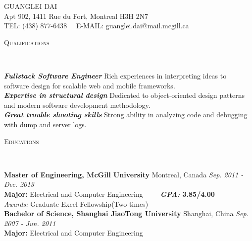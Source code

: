 \documentclass[11pt]{article}
\newenvironment{changemargin}[2]{%
  \begin{list}{}{%
    \setlength{\topsep}{0pt}%
    \setlength{\leftmargin}{#1}%
    \setlength{\rightmargin}{#2}%
    \setlength{\listparindent}{\parindent}%
    \setlength{\itemindent}{\parindent}%
    \setlength{\parsep}{\parskip}%
  }%
  \item[]}{\end{list}
}
\newcommand{\lineover}{
	\begin{changemargin}{-0.05in}{-0.05in}
		\vspace*{-8pt}
		\hrulefill \\
		\vspace*{-2pt}
	\end{changemargin}
}
\newcommand{\header}[1]{
	\begin{changemargin}{-0.5in}{-0.5in}
		\scshape{#1}\\
  	\lineover
	\end{changemargin}
}
\newcommand{\contact}[4]{
	\begin{changemargin}{-0.5in}{-0.5in}
		\begin{center}
			{\Large \scshape {#1}}\\ \smallskip
			{#2}\\ \smallskip
			{#3}\\ \smallskip
			{#4}\smallskip
		\end{center}
	\end{changemargin}
}
\newenvironment{body} {
	\vspace*{-16pt}
	\begin{changemargin}{-0.25in}{-0.5in}
  }	
	{\end{changemargin}
}
\begin{document}
\small
\contact{GUANGLEI DAI}{Apt 902, 1411 Rue du Fort,
Montreal H3H 2N7}{TEL: (438) 877-6438~~ E-MAIL: guanglei.dai@mail.mcgill.ca}
\smallskip
\header{Qualifications}
\begin{body}
	\vspace{14pt}
	\emph{\textbf{Fullstack Software Engineer}}{} {Rich experiences in interpreting ideas to software design for scalable web and mobile frameworks.} \\
	\medskip
	\emph{\textbf{Expertise in structural design}}{} {Dedicated to object-oriented design patterns and modern software development methodology.} \\
	\medskip
	\emph{\textbf{Great trouble shooting skills}}{} {Strong ability in analyzing code and debugging with dump and server logs.} \\
\end{body}
\smallskip

\header{Educations}
\begin{body}
	\vspace{14pt}
	\textbf{Master of Engineering, McGill University} {Montreal, Canada}   \hfill \emph{Sep. 2011 - Dec. 2013}{}  \\
	\textbf{Major:} Electrical and Computer Engineering~~~~~\textbf{\emph{GPA:} 3.85/4.00} \\
	\emph{Awards:} Graduate Excel Fellowship(Two times)\\

  \medskip	  
	\textbf{Bachelor of Science, Shanghai JiaoTong University} {Shanghai, China}   \hfill \emph{Sep. 2007 - Jun. 2011} \\
	\textbf{Major:} Electrical and Computer Engineering ~~~~~ \\
\end{body}
\smallskip
\end{document}
